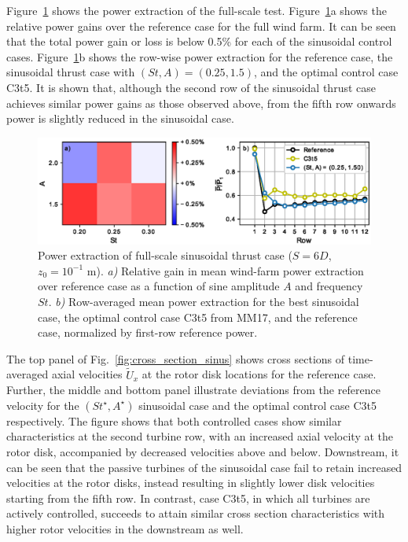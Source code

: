 \documentclass[wes, manuscript]{copernicus}
\begin{document}
Figure~\ref{fig:sinus_fullscale} shows the power extraction of the full-scale test. Figure~\ref{fig:sinus_fullscale}a shows the relative power gains over the reference case for the full wind farm. It can be seen that the total power gain or loss is below 0.5\% for each of the sinusoidal control cases. Figure~\ref{fig:sinus_fullscale}b shows the row-wise power extraction for the reference case, the sinusoidal thrust case with $(St, A) = (0.25, 1.5)$, and the optimal control case C3t5. It is shown that, although the second row of the sinusoidal thrust case achieves similar power gains as those observed above, from the fifth row onwards power is slightly reduced in the sinusoidal case.

\begin{figure}
	\centering
	\includegraphics[width=\textwidth]{gains_fullscale2.eps}
	\caption{Power extraction of full-scale sinusoidal thrust case ($S = 6D$, $z_0 = 10^{-1}$ m). \emph{a) } Relative gain in mean wind-farm power extraction over reference case as a function of sine amplitude $A$ and frequency $St$. \emph{b) } Row-averaged mean power extraction for the best sinusoidal case, the optimal control case C3t5 from MM17, and the reference case, normalized by first-row reference power.\label{fig:sinus_fullscale} }
\end{figure}

The top panel of Fig.~\ref{fig:cross_section_sinus} shows cross sections of time-averaged axial velocities $\widetilde{U}_x$ at the rotor disk locations for the reference case. Further, the middle and bottom panel illustrate deviations from the reference velocity for the $(St^\star, A^\star)$ sinusoidal case and the optimal control case C3t5 respectively.  The figure shows that both controlled cases show similar characteristics at the second turbine row, with an increased axial velocity at the rotor disk, accompanied by decreased velocities above and below. Downstream, it can be seen that the passive turbines of the sinusoidal case fail to retain increased velocities at the rotor disks, instead resulting in slightly lower disk velocities starting from the fifth row. In contrast, case C3t5, in which all turbines are actively controlled, succeeds to attain similar cross section characteristics with higher rotor velocities in the downstream as well. 
\end{document}
